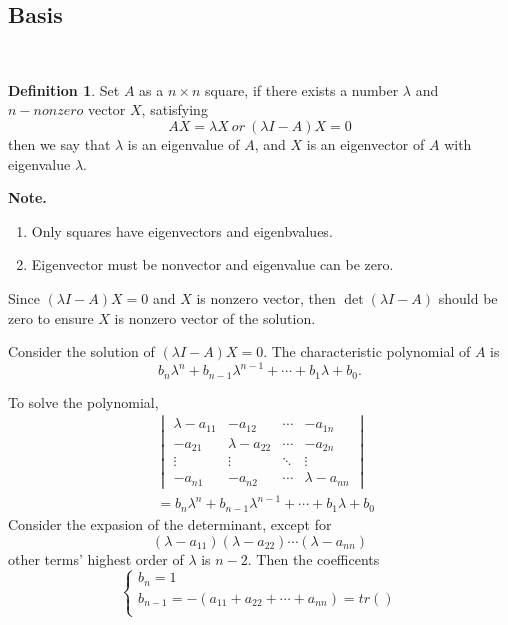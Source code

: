 \documentclass{article}
\theoremstyle{definition}
\newtheorem{defi}{Definition}[section]
\begin{document}
\subsection{Basis}\
\begin{defi}
    Set $A$ as a $n\times n$ square, if there exists a 
    number $\lambda$ and $n-nonzero$ vector $X$, satisfying 
    $$AX=\lambda X\ or\ (\lambda I-A)X=0$$
    then we say that $\lambda$ is an eigenvalue of $A$, and
    $X$ is an eigenvector of $A$ with eigenvalue $\lambda$.
\end{defi}

\textbf{Note.}
\begin{enumerate}
    \item Only squares have eigenvectors and eigenbvalues.
    \item Eigenvector must be nonvector and eigenvalue can be zero.
\end{enumerate}

Since $(\lambda I-A)X=0$ and $X$ is nonzero vector, then 
$\det (\lambda I-A)$ should be zero to ensure $X$ is nonzero vector of the solution.

Consider the solution of $(\lambda I-A)X=0$.
The characteristic polynomial of $A$ is 
$$b_{n}\lambda^{n}+b_{n-1}\lambda^{n-1}+\cdots+b_{1}\lambda+b_{0}.$$

To solve the polynomial,
\begin{align*}
    &\begin{vmatrix}
        \lambda-a_{11} & -a_{12} & \cdots & -a_{1n} \\
        -a_{21} & \lambda-a_{22} & \cdots & -a_{2n} \\
        \vdots & \vdots & \ddots & \vdots \\
        -a_{n1} & -a_{n2} & \cdots & \lambda-a_{nn}
    \end{vmatrix}
    \\ & =
    b_{n}\lambda^{n}+b_{n-1}\lambda^{n-1}+\cdots+b_{1}\lambda+b_{0}
\end{align*}
Consider the expasion of the determinant, except for 
$$(\lambda-a_{11})(\lambda-a_{22})\cdots (\lambda-a_{nn})$$ 
other terms' highest order of $\lambda$ is $n-2$.
Then the coefficents
$$\begin{cases}
    b_{n} = 1 \\
    b_{n-1} = -(a_{11}+a_{22}+\cdots+a_{nn}) = tr()\\ 
\end{cases}
$$
\end{document}
